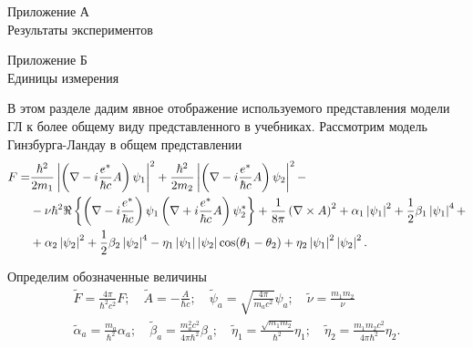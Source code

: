 \label{ch:A}
\begin{center}
    Приложение А\\
    Результаты экспериментов
\end{center}
\newpage

\label{ch:B}
\begin{center}
    Приложение Б\\
    Единицы измерения
\end{center}

В этом разделе дадим явное отображение используемого представления модели ГЛ к 
более общему виду представленного в учебниках. Рассмотрим модель 
Гинзбурга-Ландау в общем представлении
\begin{align}
  F = & \frac{\hbar^2}{2m_1} \left| \left( \nabla - i\frac{e^*}{\hbar c} A\right)
    \psi_1 \right|^2 + \frac{\hbar^2}{2m_2} \left| \left( \nabla - i\frac{e^*}{\hbar c}A
    \right) \psi_2 \right|^2 - \nonumber \\
  & - \nu\hbar^2 \Re\left\{ \left( \nabla - i\frac{e^*}{\hbar c}
    \right)\psi_1 \left( \nabla + i\frac{e^*}{\hbar c}A \right)
    \psi^*_2\right\} + \frac{1}{8\pi}\left( \nabla\times A \right)^2 +
    \alpha_1\left| \psi_1 \right|^2 + \frac{1}{2}\beta_1\left| \psi_1 \right|^4 + \nonumber \\
  & + \alpha_2\left| \psi_2 \right|^2 + \frac{1}{2}
    \beta_2\left| \psi_2 \right|^4 - \eta_1\left| \psi_1 \right|\left| \psi_2 \right|
    \cos(\theta_1 - \theta_2) + \eta_2\left| \psi_1 \right|^2\left| \psi_2 \right|^2.
    \label{eq:B-1}
\end{align}

Определим обозначенные величины
\begin{gather}
  \tilde{F} = \frac{4\pi}{\hbar^2 c^2}F; \quad
    \tilde{A} = -\frac{A}{\hbar c}; \quad
    \tilde{\psi}_a = \sqrt{\frac{4\pi}{m_a c^2}}\psi_a; \quad
    \tilde{\nu} = \frac{m_1m_2}\nu \nonumber \\
  \tilde{\alpha}_a = \frac{m_a}{\hbar^2}\alpha_a; \quad
    \tilde{\beta}_a = \frac{m^2_a c^2}{4\pi\hbar^2}\beta_a; \quad
    \tilde{\eta}_1 = \frac{\sqrt{m_1 m_2}}{\hbar^2}\eta_1; \quad
    \tilde{\eta}_2 = \frac{m_1 m_2 c^2}{4\pi\hbar^2}\eta_2. \label{eq:B-2}
\end{gather}

